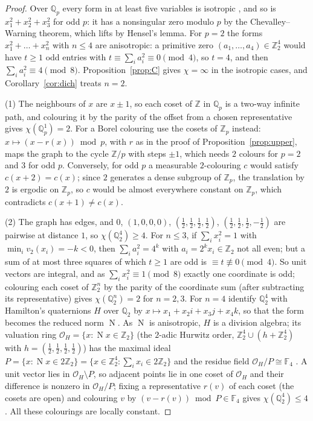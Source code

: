 \documentclass[11pt,a4paper]{amsart}
\theoremstyle{remark}
\newcommand{\F}{\mathbb{F}}
\newcommand{\Q}{\mathbb{Q}}
\newcommand{\Z}{\mathbb{Z}}
\newcommand{\Oo}{\mathcal{O}}
\newcommand{\N}{\operatorname{N}}
\begin{document}
\begin{proof}
Over $\Q_p$ every form in at least five variables is isotropic \cite[Chapter~IV, Theorem~6]{Serre}, and so is
$x_1^2+x_2^2+x_3^2$ for odd $p$: it has a nonsingular zero modulo $p$ by the Chevalley--Warning theorem, which lifts
by Hensel's lemma. For $p=2$ the forms $x_1^2+\dots+x_n^2$ with $n\le4$ are anisotropic: a primitive zero
$(a_1,\dots,a_4)\in\Z_2^4$ would have $t\ge1$ odd entries with $t\equiv\sum_ia_i^2\equiv0\pmod4$, so $t=4$, and then
$\sum_ia_i^2\equiv4\pmod8$. Proposition~\ref{prop:C} gives $\chi=\infty$ in the isotropic cases, and Corollary~\ref{cor:dich} treats
$n=2$.

(1) The neighbours of $x$ are $x\pm1$, so each coset of $\Z$ in $\Q_p$ is a two-way infinite path, and colouring it
by the parity of the offset from a chosen representative gives $\chi(\Q_p^1)=2$. For a Borel colouring use the
cosets of $\Z_p$ instead: $x\mapsto(x-r(x))\bmod p$, with $r$ as in the proof of Proposition~\ref{prop:upper},
maps the graph to the cycle
$\Z/p$ with steps $\pm1$, which needs $2$ colours for $p=2$ and $3$ for odd $p$. Conversely, for odd $p$ a
measurable $2$-colouring $c$ would satisfy $c(x+2)=c(x)$; since $2$ generates a dense subgroup of $\Z_p$, the
translation by $2$ is ergodic on $\Z_p$, so $c$ would be almost everywhere constant on $\Z_p$, which contradicts
$c(x+1)\ne c(x)$.

(2) The graph has edges, and $0$, $(1,0,0,0)$, $(\frac12,\frac12,\frac12,\frac12)$, $(\frac12,\frac12,\frac12,-\frac12)$
are pairwise at distance $1$, so $\chi(\Q_2^4)\ge4$. For $n\le3$, if $\sum_ix_i^2=1$ with $\min_iv_2(x_i)=-k<0$,
then $\sum_ia_i^2=4^k$ with $a_i=2^kx_i\in\Z_2$ not all even; but a sum of at most three squares of which
$t\ge1$ are odd is $\equiv t\not\equiv0\pmod4$. So unit vectors are integral, and as $\sum_ix_i^2\equiv1\pmod8$
exactly one coordinate is odd; colouring each coset of $\Z_2^n$ by the parity of the coordinate sum (after
subtracting its representative) gives $\chi(\Q_2^n)=2$ for $n=2,3$. For $n=4$ identify $\Q_2^4$ with Hamilton's
quaternions $H$ over $\Q_2$ by $x\mapsto x_1+x_2i+x_3j+x_4k$, so that the form becomes the reduced norm $\N$. As
$\N$ is anisotropic, $H$ is a division algebra; its valuation ring $\Oo_H=\{x:\N x\in\Z_2\}$ (the $2$-adic Hurwitz
order, $\Z_2^4\cup(h+\Z_2^4)$ with $h=(\frac12,\frac12,\frac12,\frac12)$) has the maximal ideal
$P=\{x:\N x\in2\Z_2\}=\{x\in\Z_2^4:\sum_ix_i\in2\Z_2\}$ and the residue field $\Oo_H/P\cong\F_4$
\cite[Proposition~13.3.4 and Theorem~13.3.11]{Voight}. A unit vector lies in $\Oo_H\setminus P$, so adjacent points
lie in one coset of $\Oo_H$ and their difference is nonzero in $\Oo_H/P$; fixing a representative $r(v)$ of each
coset (the cosets are open) and colouring $v$ by $(v-r(v))\bmod P\in\F_4$ gives $\chi(\Q_2^4)\le4$. All these
colourings are locally constant.
\end{proof}
\end{document}
